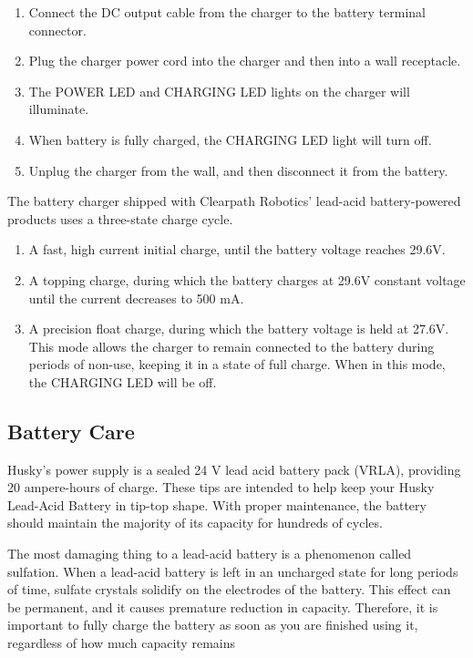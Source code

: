 \documentclass[]{clearpath-latex/clearpath-manual}
\begin{document}
\begin{enumerate}
	\item Connect the DC output cable from the charger to the battery terminal connector.
	\item Plug the charger power cord into the charger and then into a wall receptacle.
	\item The POWER LED and CHARGING LED lights on the charger will illuminate.
	\item When battery is fully charged, the CHARGING LED light will turn off.
	\item Unplug the charger from the wall, and then disconnect it from the battery.
\end{enumerate}

The battery charger shipped with Clearpath Robotics’ lead-acid
battery-powered products uses a three-state charge cycle.

\begin{enumerate}
		\item A fast, high current initial charge, until the battery voltage reaches 29.6V.
		\item A topping charge, during which the battery charges at 29.6V constant voltage
		until the current decreases to 500 mA.
		\item A precision float charge, during which the battery voltage is held at 27.6V.
		This mode allows the charger to remain connected to the battery during periods of non-use,
		keeping it in a state of full charge. When in this mode, the CHARGING LED will be off.
\end{enumerate}

\subsection{Battery Care}
Husky’s power supply is a sealed 24 V lead acid battery pack (VRLA), providing 20 ampere-hours of charge. These tips are
intended to help keep your Husky Lead-Acid Battery in tip-top shape.  With proper maintenance, the battery should
maintain the majority of its capacity for hundreds of cycles.

The most damaging thing to a lead-acid battery is a phenomenon called sulfation.
When a lead-acid battery is left in an uncharged state for long periods of time,
sulfate crystals solidify on the electrodes of the battery.  This effect can be permanent,
and it causes premature reduction in capacity.  Therefore, it is important to fully charge
the battery as soon as you are finished using it, regardless of how much capacity remains
\end{document}
